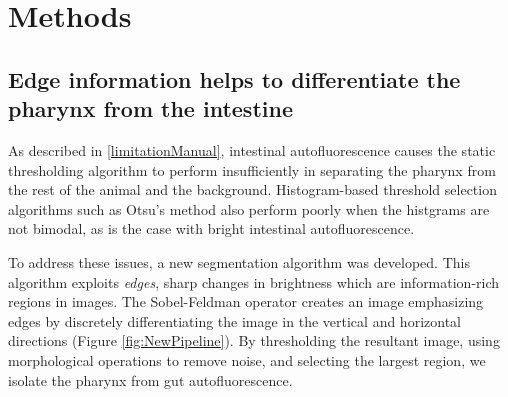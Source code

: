 
\chapter{Methods} %

\label{Chapter2} %


\section{Edge information helps to differentiate the pharynx from the intestine} \label{segMethod}

As described in \ref{limitationManual}, intestinal autofluorescence causes the static thresholding algorithm to perform insufficiently in separating the pharynx from the rest of the animal and the background. Histogram-based threshold selection algorithms such as Otsu's method also perform poorly when the histgrams are not bimodal, as is the case with bright intestinal autofluorescence.

To address these issues, a new segmentation algorithm was developed. This algorithm exploits \textit{edges}, sharp changes in brightness which are information-rich regions in images. The Sobel-Feldman operator creates an image emphasizing edges by discretely differentiating the image in the vertical and horizontal directions (Figure \ref{fig:NewPipeline}). By thresholding the resultant image, using morphological operations to remove noise, and selecting the largest region, we isolate the pharynx from gut autofluorescence.

